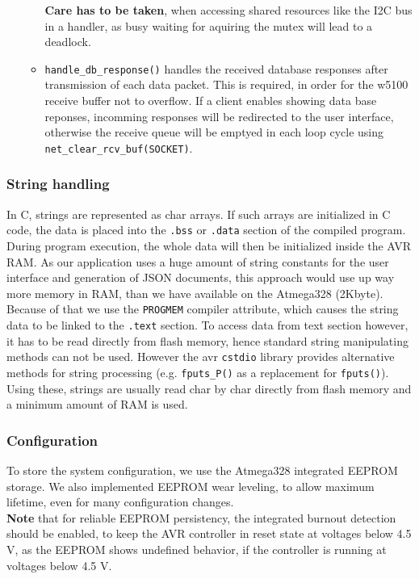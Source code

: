 \documentclass[a4paper]{scrreprt}
\begin{document}
\begin{enumerate}
\begin{itemize}
    \textbf{Care has to be taken}, when accessing shared resources like the I2C bus in a handler, as busy waiting for aquiring the mutex will lead to a deadlock.
        \item \texttt{handle\_db\_response()} handles the received database responses after transmission of each data packet. This is required, in order for the w5100 receive buffer not to overflow.
            If a client enables showing data base reponses, incomming responses will be redirected to the user interface,
otherwise the receive queue will be emptyed in each loop cycle using \texttt{net\_clear\_rcv\_buf(SOCKET)}.
    \end{itemize}
\end{enumerate}
\subsubsection{String handling}
In C, strings are represented as char arrays. If such arrays are initialized in C code, the data is placed
into the \texttt{.bss} or \texttt{.data} section of the compiled program. During program execution, the whole data
will then be initialized inside the AVR RAM. As our application uses a huge amount of string constants for the user interface and
generation of JSON documents, this approach would use up way more memory in RAM, than we have available on the Atmega328 (2Kbyte).\\
Because of that we use the \texttt{PROGMEM} compiler attribute, which causes the string data to be linked to the \texttt{.text} section.
To access data from text section however, it has to be read directly from flash memory, hence standard string manipulating methods
can not be used. However the avr \texttt{cstdio} library provides alternative methods for string processing (e.g. \texttt{fputs\_P()}
as a replacement for \texttt{fputs()}). Using these, strings are usually read char by char directly from flash memory and a minimum
amount of RAM is used.
\subsubsection{Configuration}
To store the system configuration, we use the Atmega328 integrated EEPROM storage. We also implemented EEPROM wear leveling, to allow
maximum lifetime, even for many configuration changes.\\
\textbf{Note} that for reliable EEPROM persistency, the integrated burnout detection should be enabled, to keep the AVR controller in reset state at voltages below 4.5 V, as the EEPROM shows undefined behavior, if the controller is running at voltages below 4.5 V.
\end{document}
